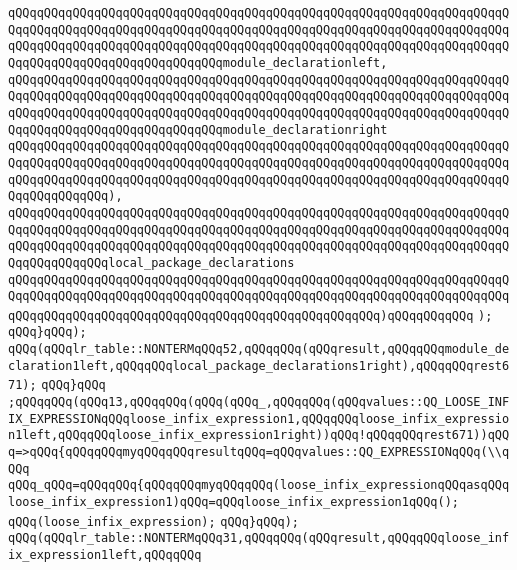 \verb|qQQqqQQqqQQqqQQqqQQqqQQqqQQqqQQqqQQqqQQqqQQqqQQqqQQqqQQqqQQqqQQqqQQqqQQqqQQqqQQqqQQqqQQqqQQqqQQqqQQqqQQqqQQqqQQqqQQqqQQqqQQqqQQqqQQqqQQqqQQqqQQqqQQqqQQqqQQqqQQqqQQqqQQqqQQqqQQqqQQqqQQqqQQqqQQqqQQqqQQqqQQqqQQqqQQqqQQqqQQqqQQqqQQqqQQqqQQqqQQqmodule_declarationleft,|\newline
\verb|qQQqqQQqqQQqqQQqqQQqqQQqqQQqqQQqqQQqqQQqqQQqqQQqqQQqqQQqqQQqqQQqqQQqqQQqqQQqqQQqqQQqqQQqqQQqqQQqqQQqqQQqqQQqqQQqqQQqqQQqqQQqqQQqqQQqqQQqqQQqqQQqqQQqqQQqqQQqqQQqqQQqqQQqqQQqqQQqqQQqqQQqqQQqqQQqqQQqqQQqqQQqqQQqqQQqqQQqqQQqqQQqqQQqqQQqqQQqqQQqmodule_declarationright|\newline
\verb|qQQqqQQqqQQqqQQqqQQqqQQqqQQqqQQqqQQqqQQqqQQqqQQqqQQqqQQqqQQqqQQqqQQqqQQqqQQqqQQqqQQqqQQqqQQqqQQqqQQqqQQqqQQqqQQqqQQqqQQqqQQqqQQqqQQqqQQqqQQqqQQqqQQqqQQqqQQqqQQqqQQqqQQqqQQqqQQqqQQqqQQqqQQqqQQqqQQqqQQqqQQqqQQqqQQqqQQqqQQqqQQq),|\newline
\verb|qQQqqQQqqQQqqQQqqQQqqQQqqQQqqQQqqQQqqQQqqQQqqQQqqQQqqQQqqQQqqQQqqQQqqQQqqQQqqQQqqQQqqQQqqQQqqQQqqQQqqQQqqQQqqQQqqQQqqQQqqQQqqQQqqQQqqQQqqQQqqQQqqQQqqQQqqQQqqQQqqQQqqQQqqQQqqQQqqQQqqQQqqQQqqQQqqQQqqQQqqQQqqQQqqQQqqQQqqQQqqQQqlocal_package_declarations|\newline
\verb|qQQqqQQqqQQqqQQqqQQqqQQqqQQqqQQqqQQqqQQqqQQqqQQqqQQqqQQqqQQqqQQqqQQqqQQqqQQqqQQqqQQqqQQqqQQqqQQqqQQqqQQqqQQqqQQqqQQqqQQqqQQqqQQqqQQqqQQqqQQqqQQqqQQqqQQqqQQqqQQqqQQqqQQqqQQqqQQqqQQqqQQqqQQqqQQq)qQQqqQQqqQQq|\newline
\verb|);|\newline
\verb|qQQq}qQQq);|\newline
\verb|qQQq(qQQqlr_table::NONTERMqQQq52,qQQqqQQq(qQQqresult,qQQqqQQqmodule_declaration1left,qQQqqQQqlocal_package_declarations1right),qQQqqQQqrest671);|\newline
\verb|qQQq}qQQq|\newline
\verb|;qQQqqQQq(qQQq13,qQQqqQQq(qQQq(qQQq_,qQQqqQQq(qQQqvalues::QQ_LOOSE_INFIX_EXPRESSIONqQQqloose_infix_expression1,qQQqqQQqloose_infix_expression1left,qQQqqQQqloose_infix_expression1right))qQQq!qQQqqQQqrest671))qQQq=>qQQq{qQQqqQQqmyqQQqqQQqresultqQQq=qQQqvalues::QQ_EXPRESSIONqQQq(\\qQQq|\newline
\verb|qQQq_qQQq=qQQqqQQq{qQQqqQQqmyqQQqqQQq(loose_infix_expressionqQQqasqQQqloose_infix_expression1)qQQq=qQQqloose_infix_expression1qQQq();|\newline
\verb|qQQq(loose_infix_expression);|\newline
\verb|qQQq}qQQq);|\newline
\verb|qQQq(qQQqlr_table::NONTERMqQQq31,qQQqqQQq(qQQqresult,qQQqqQQqloose_infix_expression1left,qQQqqQQq|\newline
